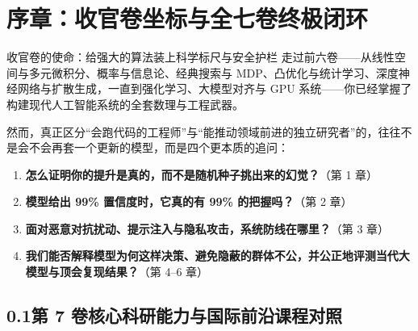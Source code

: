 \chapter*{序章：收官卷坐标与全七卷终极闭环}


\begin{chapIntro}{收官卷的使命：给强大的算法装上科学标尺与安全护栏}
走过前六卷——从线性空间与多元微积分、概率与信息论、经典搜索与 MDP、凸优化与统计学习、深度神经网络与扩散生成，一直到强化学习、大模型对齐与 GPU 系统——你已经掌握了构建现代人工智能系统的全套数理与工程武器。

然而，真正区分“会跑代码的工程师”与“能推动领域前进的独立研究者”的，往往不是会不会再套一个更新的模型，而是四个更本质的追问：
\begin{enumerate}
  \item \textbf{怎么证明你的提升是真的，而不是随机种子挑出来的幻觉？}（第 1 章）
  \item \textbf{模型给出 99\% 置信度时，它真的有 99\% 的把握吗？}（第 2 章）
  \item \textbf{面对恶意对抗扰动、提示注入与隐私攻击，系统防线在哪里？}（第 3 章）
  \item \textbf{我们能否解释模型为何这样决策、避免隐蔽的群体不公，并公正地评测当代大模型与顶会复现结果？}（第 4--6 章）
\end{enumerate}
\end{chapIntro}

\section*{0.1\quad 第 7 卷核心科研能力与国际前沿课程对照}

